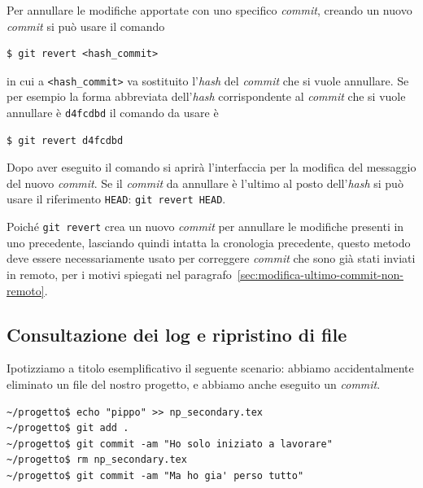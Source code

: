 \documentclass[a4paper,12pt,oneside]{article}
\begin{document}
Per annullare le modifiche apportate con uno specifico \emph{commit}, creando un
nuovo \emph{commit} si può usare il comando
\begin{lstlisting}
$ git revert <hash_commit>
\end{lstlisting}
in cui a \lstinline|<hash_commit>| va sostituito l'\emph{hash} del \emph{commit}
che si vuole annullare. Se per esempio la forma abbreviata dell'\emph{hash}
corrispondente al \emph{commit} che si vuole annullare è \lstinline|d4fcdbd|
il comando da usare è
\begin{lstlisting}
$ git revert d4fcdbd
\end{lstlisting}
Dopo aver eseguito il comando si aprirà l'interfaccia per la modifica del
messaggio del nuovo \emph{commit}. Se il \emph{commit} da annullare è l'ultimo
al posto dell'\emph{hash} si può usare il riferimento \lstinline|HEAD|:
\lstinline|git revert HEAD|.

Poiché \lstinline|git revert| crea un nuovo \emph{commit} per annullare le
modifiche presenti in uno precedente, lasciando quindi intatta la cronologia
precedente, questo metodo deve essere necessariamente usato per correggere
\emph{commit} che sono già stati inviati in remoto, per i motivi spiegati nel
paragrafo~\ref{sec:modifica-ultimo-commit-non-remoto}.


\subsection{Consultazione dei log e ripristino di file}
Ipotizziamo a titolo esemplificativo il seguente scenario:
abbiamo accidentalmente eliminato un file del nostro
progetto, e abbiamo anche eseguito un \emph{commit}.
\begin{lstlisting}
~/progetto$ echo "pippo" >> np_secondary.tex
~/progetto$ git add .
~/progetto$ git commit -am "Ho solo iniziato a lavorare"
~/progetto$ rm np_secondary.tex
~/progetto$ git commit -am "Ma ho gia' perso tutto"
\end{lstlisting}
\end{document}
